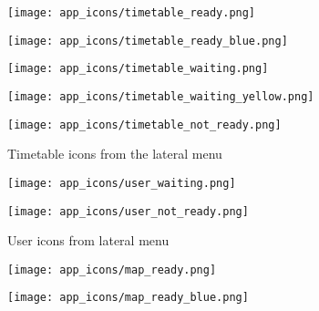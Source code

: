 \begin{appendices}
\begin{figure*}[h!t]
	\centering
	\begin{multicols}{4}
		\hspace{\linewidth} 
	    \texttt{[image: app\_icons/timetable\_ready.png]}\par 
	    \texttt{[image: app\_icons/timetable\_ready\_blue.png]}\par 
	    \hspace{\linewidth}
    \end{multicols}

	\begin{multicols}{4}
		\hspace{\linewidth} 
	    \texttt{[image: app\_icons/timetable\_waiting.png]}\par 
	    \texttt{[image: app\_icons/timetable\_waiting\_yellow.png]}\par 
	    \hspace{\linewidth}
    \end{multicols}

    \texttt{[image: app\_icons/timetable\_not\_ready.png]}

	\caption{Timetable icons from the lateral menu}
\end{figure*}

\begin{figure*}[h!t]
	\centering
	\begin{multicols}{4}
		\hspace{\linewidth} 
	    \texttt{[image: app\_icons/user\_waiting.png]}\par 
	    \texttt{[image: app\_icons/user\_not\_ready.png]}\par 
	    \hspace{\linewidth}
    \end{multicols}
	\caption{User icons from lateral menu}
\end{figure*}

\begin{figure*}[h!t]
	\centering
	\begin{multicols}{4}
		\hspace{\linewidth} 
	    \texttt{[image: app\_icons/map\_ready.png]}\par 
	    \texttt{[image: app\_icons/map\_ready\_blue.png]}\par 
	    \hspace{\linewidth}
    \end{multicols}


\end{figure*}
\end{appendices}
